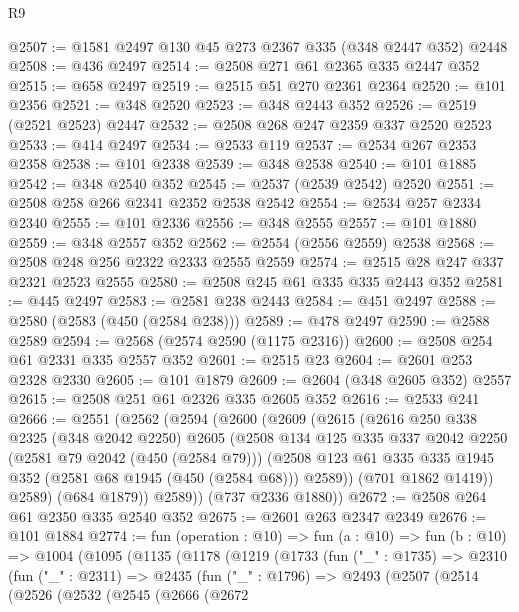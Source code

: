 \begin{lexlean}{R9}
\begin{coremodule}
@2507 := @1581 @2497 @130 @45 @273 @2367 @335 (@348 @2447 @352) @2448
@2508 := @436 @2497
@2514 := @2508 @271 @61 @2365 @335 @2447 @352
@2515 := @658 @2497
@2519 := @2515 @51 @270 @2361 @2364
@2520 := @101 @2356
@2521 := @348 @2520
@2523 := @348 @2443 @352
@2526 := @2519 (@2521 @2523) @2447
@2532 := @2508 @268 @247 @2359 @337 @2520 @2523
@2533 := @414 @2497
@2534 := @2533 @119
@2537 := @2534 @267 @2353 @2358
@2538 := @101 @2338
@2539 := @348 @2538
@2540 := @101 @1885
@2542 := @348 @2540 @352
@2545 := @2537 (@2539 @2542) @2520
@2551 := @2508 @258 @266 @2341 @2352 @2538 @2542
@2554 := @2534 @257 @2334 @2340
@2555 := @101 @2336
@2556 := @348 @2555
@2557 := @101 @1880
@2559 := @348 @2557 @352
@2562 := @2554 (@2556 @2559) @2538
@2568 := @2508 @248 @256 @2322 @2333 @2555 @2559
@2574 := @2515 @28 @247 @337 @2321 @2523 @2555
@2580 := @2508 @245 @61 @335 @335 @2443 @352
@2581 := @445 @2497
@2583 := @2581 @238 @2443
@2584 := @451 @2497
@2588 := @2580 (@2583 (@450 (@2584 @238)))
@2589 := @478 @2497
@2590 := @2588 @2589
@2594 := @2568 (@2574 @2590 (@1175 @2316))
@2600 := @2508 @254 @61 @2331 @335 @2557 @352
@2601 := @2515 @23
@2604 := @2601 @253 @2328 @2330
@2605 := @101 @1879
@2609 := @2604 (@348 @2605 @352) @2557
@2615 := @2508 @251 @61 @2326 @335 @2605 @352
@2616 := @2533 @241
@2666 := @2551
    (@2562
      (@2594
        (@2600
          (@2609
            (@2615
              (@2616
                @250
                @338
                @2325
                (@348 @2042 @2250)
                @2605
                (@2508
                  @134
                  @125
                  @335
                  @337
                  @2042
                  @2250
                  (@2581 @79 @2042 (@450 (@2584 @79)))
                  (@2508 @123 @61 @335 @335 @1945 @352 (@2581 @68 @1945 (@450 (@2584 @68))) @2589))
                (@701 @1862 @1419))
              @2589)
            (@684 @1879))
          @2589))
      (@737 @2336 @1880))
@2672 := @2508 @264 @61 @2350 @335 @2540 @352
@2675 := @2601 @263 @2347 @2349
@2676 := @101 @1884
@2774 := fun (operation : @10) =>
  fun (a : @10) =>
  fun (b : @10) =>
  @1004
    (@1095
      (@1135
        (@1178
          (@1219
            (@1733
              (fun ("_" : @1735) =>
              @2310
                (fun ("_" : @2311) =>
                @2435
                  (fun ("_" : @1796) =>
                  @2493
                    (@2507
                      (@2514
                        (@2526
                          (@2532
                            (@2545
                              (@2666
                                (@2672

\end{coremodule}
\end{lexlean}
